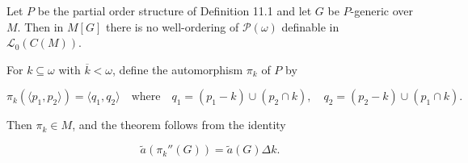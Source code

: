 Let $P$ be the partial order structure of Definition 11.1 and let $G$ be $P$-generic over $M$. Then in $M[G]$ there is no well-ordering of $\mathcal{P}(\omega)$ definable in $\mathcal{L}_0(C(M))$.

For $k \subseteq \omega$ with $\overline{k} < \omega$, define the automorphism $\pi_k$ of $P$ by

$$\pi_k(\langle p_1, p_2 \rangle) = \langle q_1, q_2 \rangle \quad \text{where} \quad q_1 = (p_1 - k) \cup (p_2 \cap k), \quad q_2 = (p_2 - k) \cup (p_1 \cap k).$$

Then $\pi_k \in M$, and the theorem follows from the identity

$$\tilde{a}(\pi_k''(G)) = \tilde{a}(G) \Delta k.$$
